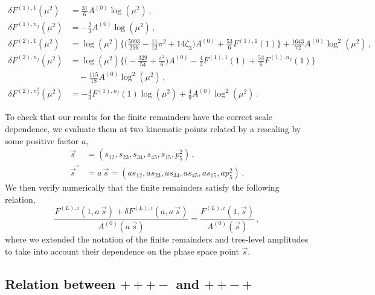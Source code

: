 \documentclass[main.tex]{subfiles}
\begin{document}
\begin{align}
\delta F^{(1),1}(\mu^2)   & =  \frac{31}{6} A^{(0)} \log(\mu^2) \,, \\
\delta F^{(1),n_f}(\mu^2) & =  - \frac{2}{3} A^{(0)} \log(\mu^2) \,, \\
\delta F^{(2),1}(\mu^2) & = \log(\mu^2) \bigg\lbrace \bigg(\frac{5093}{216} - \frac{11}{12}\pi^2 + 14 \zeta_3\bigg) A^{(0)} 
                              + \frac{53}{6}F^{(1),1}(1) \bigg\rbrace  + \frac{1643}{72} A^{(0)} \log^2(\mu^2)  \,, \\
\delta F^{(2),n_f}(\mu^2) & = \log(\mu^2) \bigg\lbrace \bigg(-\frac{329}{54} + \frac{\pi^2}{6} \bigg) A^{(0)} 
                               - \frac{4}{3}F^{(1),1}(1)  + \frac{53}{6}F^{(1),n_f}(1) \bigg\rbrace \nonumber  \\
                            & \quad - \frac{115}{18} A^{(0)} \log^2(\mu^2) \,, \\
\delta F^{(2),n_f^2}(\mu^2) & = - \frac{4}{3} F^{(1),n_f}(1) \log(\mu^2) + \frac{4}{9} A^{(0)} \log^2(\mu^2) \, . 
\end{align}
\endgroup

To check that our results for the finite remainders have the correct scale dependence, we evaluate them at two kinematic points related by a rescaling by some positive factor $a$,
\begin{equation}
\begin{aligned}
\vec{s} &= (s_{12},s_{23},s_{34},s_{45},s_{15},p_5^2) \,,  \\ 
\vec{s}^{\,'} &= a \, \vec{s} = (a s_{12},a s_{23},a s_{34},a s_{45},a s_{15},a p_5^2) \,. 
\end{aligned}
\end{equation}
We then verify numerically that the finite remainders satisfy the following relation,
\begin{equation}
  \frac{F^{(L),i}(1,a \, \vec{s})+\delta F^{(L),i}(a,a \, \vec{s})}{A^{(0)}(a\,\vec{s})} 
= \frac{F^{(L),i}(1,\vec{s})}{A^{(0)}(\vec{s})} \,,
\end{equation}
where we extended the notation of the finite remainders and tree-level amplitudes to take into account their dependence on the phase space point $\vec{s}$.


\subsection{Relation between $+++-$ and $++-+$} 
\end{document}
